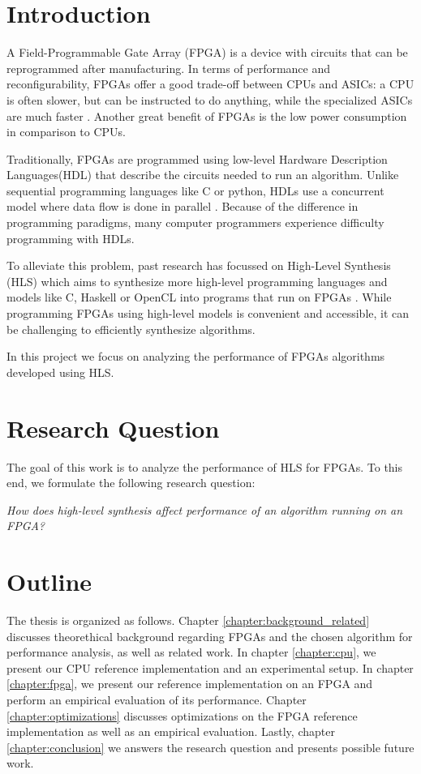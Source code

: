 \section{Introduction} \label{section:introduction}

A Field-Programmable Gate Array (FPGA) is a device with circuits that can be reprogrammed after manufacturing.
In terms of performance and reconfigurability, FPGAs offer a good trade-off between CPUs and ASICs:
a CPU is often slower, but can be instructed to do anything, while the specialized ASICs are much faster \cite{zohouri_evaluating_2016}.
Another great benefit of FPGAs is the low power consumption in comparison to CPUs.

Traditionally, FPGAs are programmed using low-level Hardware Description Languages\linebreak(HDL) that describe the circuits needed to run an algorithm.
Unlike sequential programming languages like C or python, HDLs use a concurrent model where data flow is done in parallel \cite{zohouri_evaluating_2016}.
Because of the difference in programming paradigms, many computer programmers experience difficulty programming with HDLs.

To alleviate this problem, past research has focussed on High-Level Synthesis (HLS) which aims to synthesize more high-level programming languages and models like C, Haskell or OpenCL into programs that run on FPGAs \cite{paulino_optimizing_2020}.
While programming FPGAs using high-level models is convenient and accessible, it can be challenging to efficiently synthesize algorithms.

In this project we focus on analyzing the performance of FPGAs algorithms developed using HLS.

\section{Research Question} \label{section:research_question}

The goal of this work is to analyze the performance of HLS for FPGAs.
To this end, we formulate the following research question:

\textit{How does high-level synthesis affect performance of an algorithm running on an FPGA?}

\section{Outline} \label{section:outline}

The thesis is organized as follows.
Chapter \ref{chapter:background_related} discusses theorethical background regarding FPGAs and the chosen algorithm for performance analysis, as well as related work.
In chapter \ref{chapter:cpu}, we present our CPU reference implementation and an experimental setup.
In chapter \ref{chapter:fpga}, we present our reference implementation on an FPGA and perform an empirical evaluation of its performance.
Chapter \ref{chapter:optimizations} discusses optimizations on the FPGA reference implementation as well as an empirical evaluation.
Lastly, chapter \ref{chapter:conclusion} we answers the research question and presents possible future work.
